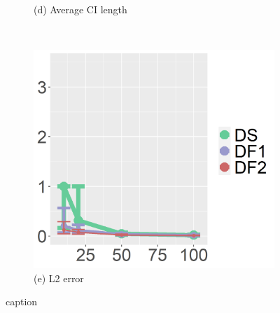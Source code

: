 \begin{figure}[ht!]
\begin{subfigure}[b]{.40\columnwidth}
    \caption{(d) Average CI length}
\end{subfigure}
\\
\centering
\begin{subfigure}[b]{.40\columnwidth} 
    \includegraphics[width=\columnwidth]{../../plot/L2_1_IQR.png}
    \caption{(e) L2 error}
\end{subfigure}
\hfill
\caption{caption}
\label{fig:IQR}
\end{figure}

